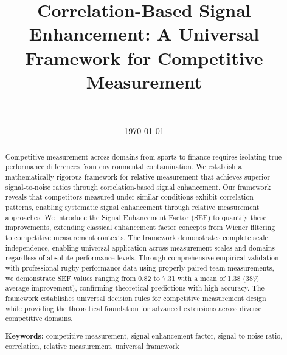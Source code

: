 \documentclass[11pt,a4paper]{article}
\title{Correlation-Based Signal Enhancement: A Universal Framework for Competitive Measurement}
\author{
    \authorone \\
    \textit{\affiliationone}
}
\date{\today}
\begin{document}
\maketitle

\begin{abstract}
Competitive measurement across domains from sports to finance requires isolating true performance differences from environmental contamination. We establish a mathematically rigorous framework for relative measurement that achieves superior signal-to-noise ratios through correlation-based signal enhancement. Our framework reveals that competitors measured under similar conditions exhibit correlation patterns, enabling systematic signal enhancement through relative measurement approaches. We introduce the Signal Enhancement Factor (SEF) to quantify these improvements, extending classical enhancement factor concepts from Wiener filtering to competitive measurement contexts. The framework demonstrates complete scale independence, enabling universal application across measurement scales and domains regardless of absolute performance levels. Through comprehensive empirical validation with professional rugby performance data using properly paired team measurements, we demonstrate SEF values ranging from 0.82 to 7.31 with a mean of 1.38 (38\% average improvement), confirming theoretical predictions with high accuracy. The framework establishes universal decision rules for competitive measurement design while providing the theoretical foundation for advanced extensions across diverse competitive domains.

\textbf{Keywords:} competitive measurement, signal enhancement factor, signal-to-noise ratio, correlation, relative measurement, universal framework
\end{abstract}













\end{document}
